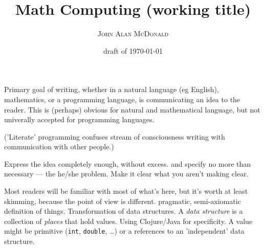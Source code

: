 \documentclass[11pt,openany]{book}
\title{Math Computing (working title)}
\author{\textsc{John Alan McDonald}}
\date{draft of \today}
\begin{document}
\maketitle
\frontmatter
\begingroup
\let\onecolumn\twocolumn
\sffamily
\tableofcontents
\rmfamily
\endgroup
\mainmatter
\setcounter{baseSectionLevel}{6}
\setcounter{currentlevel}{\value{baseSectionLevel}}
\setcounter{currentlevel}{\value{baseSectionLevel}}
\setcounter{currentlevel}{\value{baseSectionLevel}}

Primary goal of writing, whether in a natural language (eg
English), mathematics, or a programming language, is communicating
an idea to the reader.
This is (perhaps) obvious for natural and mathematical language,
but not univerally accepted for programming languages.

\cite{Halmos1970HowToWrite}

('Literate' programming confuses stream of consciousness writing
with communication with other people.)

Express the idea completely enough, without excess.
and specify no more than
necessary --- the he/she problem.
Make it clear what you aren't making clear.

\setcounter{currentlevel}{\value{baseSectionLevel}}

Most readers will be familiar with most of what's here, 
but it's worth at least skimming, 
because the point of view is different.
\setcounter{currentlevel}{\value{baseSectionLevel}}
pragmatic, semi-axiomatic definition of things.
\setcounter{currentlevel}{\value{baseSectionLevel}}
Transformation of data structures.
\setcounter{currentlevel}{\value{baseSectionLevel}}
A \textit{data structure} is a collection of \textit{places}
that hold values. 
Using Clojure/Java for specificity.
A value might be primitive
(\texttt{int}, \texttt{double}, \ldots)
or a references to an 'independent' data structure.
\end{document}
